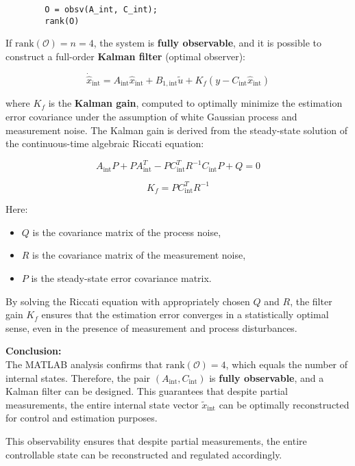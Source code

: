 \documentclass[]{report}
\begin{document}
	\begin{verbatim}
		O = obsv(A_int, C_int);
		rank(O)
	\end{verbatim}
	
	If $\text{rank}(\mathcal{O}) = n = 4$, the system is \textbf{fully observable}, and it is possible to construct a full-order \textbf{Kalman filter} (optimal observer):
	
	\[
	\dot{\hat{x}}_{\text{int}} = A_{\text{int}} \hat{x}_{\text{int}} + B_{1,\text{int}} \tilde{u} + K_f(y - C_{\text{int}} \hat{x}_{\text{int}})
	\]
	
	where $K_f$ is the \textbf{Kalman gain}, computed to optimally minimize the estimation error covariance under the assumption of white Gaussian process and measurement noise. The Kalman gain is derived from the steady-state solution of the continuous-time algebraic Riccati equation:
	
	\[
	A_{\text{int}} P + P A_{\text{int}}^T - P C_{\text{int}}^T R^{-1} C_{\text{int}} P + Q = 0
	\]
	
	\[
	K_f = P C_{\text{int}}^T R^{-1}
	\]
	
	Here:
	\begin{itemize}
		\item $Q$ is the covariance matrix of the process noise,
		\item $R$ is the covariance matrix of the measurement noise,
		\item $P$ is the steady-state error covariance matrix.
	\end{itemize}
	
	By solving the Riccati equation with appropriately chosen $Q$ and $R$, the filter gain $K_f$ ensures that the estimation error converges in a statistically optimal sense, even in the presence of measurement and process disturbances.
	
	
	
	\textbf{Conclusion:} \\
	The MATLAB analysis confirms that $\text{rank}(\mathcal{O}) = 4$, which equals the number of internal states. Therefore, the pair $(A_{\text{int}}, C_{\text{int}})$ is \textbf{fully observable}, and a Kalman filter can be designed. This guarantees that despite partial measurements, the entire internal state vector $\tilde{x}_{\text{int}}$ can be optimally reconstructed for control and estimation purposes.
	
	
	
	This observability ensures that despite partial measurements, the entire controllable state can be reconstructed and regulated accordingly.
	
\end{document}
